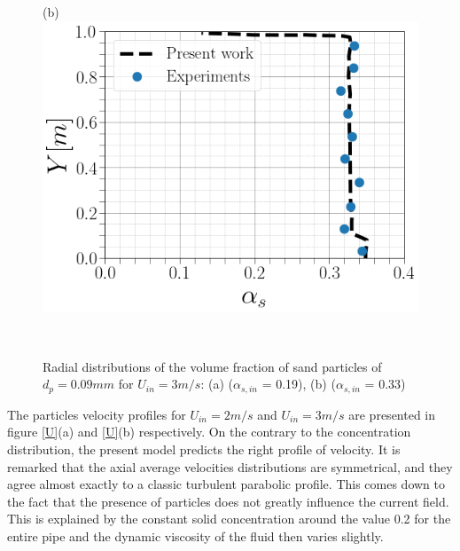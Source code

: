 \documentclass[review,3p,times,12pt]{elsarticle}
\begin{document}
\begin{minipage}[t]{0.5\textwidth}
\begin{figure}[H]
\begin{center}
(b)\includegraphics[scale = 0.3]{C33}
 \end{center}
\end{figure}
\end{minipage}\\
\begin{figure}[H]
    \centering
    \caption{Radial distributions of the volume fraction of sand particles of $d_p= 0.09 mm$ for $U_{in} = 3 m/s$: (a) ($\alpha_{s,in}$ = 0.19), (b) ($\alpha_{s,in}$ = 0.33) }
    \label{solid}
\end{figure}
The particles velocity  profiles for $U_{in} = 2 m/s$ and $U_{in} = 3 m/s$ are presented in figure \ref{U}(a) and \ref{U}(b) respectively. On the contrary to the concentration distribution, the present model predicts the right profile of velocity. It is remarked that the axial average velocities  distributions are symmetrical, and they agree almost exactly to a classic turbulent parabolic profile. This comes down to the fact that the presence of particles does not greatly influence the current field. This is explained by the constant solid concentration around the value 0.2 for the entire pipe and the dynamic viscosity of the fluid then varies slightly.\\
\end{document}
